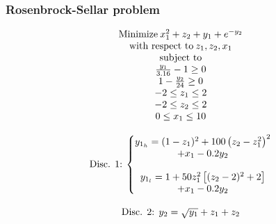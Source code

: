 \documentclass[conf]{new-aiaa}
\begin{document}
\subsubsection{Rosenbrock-Sellar problem}
\begin{equation}
    \begin{matrix}
    \textnormal{Minimize} \: x_1^2+z_2+y_1+e^{-y_2} \\
    \textnormal{with respect to} \: z_1,z_2,x_1 \\
    \textnormal{subject to}  \\
    \frac{y_1}{3.16}-1\geq 0  \\
    1-\frac{y_2}{24}\geq 0 \\
    -2\leq z_1 \leq 2 \\
    -2\leq z_2 \leq 2 \\
    0\leq x_1 \leq 10 \\
    \\
    \textnormal{Disc. 1:} \: \left\{\begin{matrix} 
     y_{1_h}=(1-z_1)^2+100\left(z_2-z_1^2\right)^2\\+x_1-0.2y_2 \\
    \\
    y_{1_l}=1+50z_1^2\left[(z_2-2)^2+2\right]\\+x_1-0.2y_2
    \end{matrix} \right. \\
    \\
    \textnormal{Disc. 2:} \:\: y_2=\sqrt{y_1}+z_1+z_2\\
    \end{matrix}
\end{equation}
\end{document}
